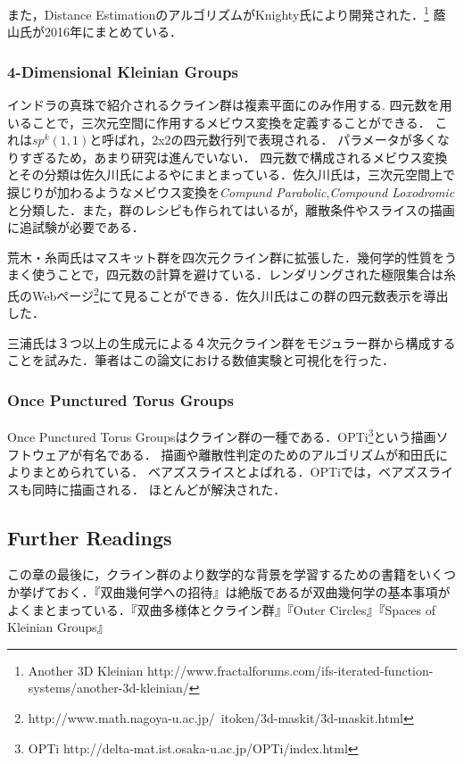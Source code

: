 また，Distance EstimationのアルゴリズムがKnighty氏により開発された．\footnote{Another 3D Kleinian http://www.fractalforums.com/ifs-iterated-function-systems/another-3d-kleinian/}
蔭山氏が2016年にまとめている\cite{kageyama}．

\subsubsection{4-Dimensional Kleinian Groups}
インドラの真珠で紹介されるクライン群は複素平面にのみ作用する.
四元数を用いることで，三次元空間に作用するメビウス変換を定義することができる．
これは$sp^k(1, 1)$と呼ばれ，2x2の四元数行列で表現される．
パラメータが多くなりすぎるため，あまり研究は進んでいない．
四元数で構成されるメビウス変換とその分類は佐久川氏による\cite{sakugawaMaster}や\cite{accidentalParabolic}にまとまっている．佐久川氏は，三次元空間上で捩じりが加わるようなメビウス変換を{\it Compund Parabolic},{\it Compound Loxodromic}と分類した．また，群のレシピも作られてはいるが，離散条件やスライスの描画に追試験が必要である．

荒木・糸両氏はマスキット群を四次元クライン群に拡張した\cite{maskit}．幾何学的性質をうまく使うことで，四元数の計算を避けている．レンダリングされた極限集合は糸氏のWebページ\footnote{http://www.math.nagoya-u.ac.jp/~itoken/3d-maskit/3d-maskit.html}にて見ることができる．佐久川氏はこの群の四元数表示を導出した\cite{sakugawa4d}．

三浦氏は３つ以上の生成元による４次元クライン群をモジュラー群から構成することを試みた\cite{miura}．筆者はこの論文における数値実験と可視化を行った．

\subsubsection{Once Punctured Torus Groups}
Once Punctured Torus Groupsはクライン群の一種である．OPTi\footnote{OPTi http://delta-mat.ist.osaka-u.ac.jp/OPTi/index.html}という描画ソフトウェアが有名である．
描画や離散性判定のためのアルゴリズムが和田氏によりまとめられている．
ベアズスライスとよばれる．OPTiでは，ベアズスライスも同時に描画される．
ほとんどが解決された．

\subsection{Further Readings}
この章の最後に，クライン群のより数学的な背景を学習するための書籍をいくつか挙げておく．『双曲幾何学への招待』\cite{invitation}は絶版であるが双曲幾何学の基本事項がよくまとまっている．『双曲多様体とクライン群』\cite{manifold}『Outer Circles』\cite{outerCircles}『Spaces of Kleinian Groups』\cite{space}